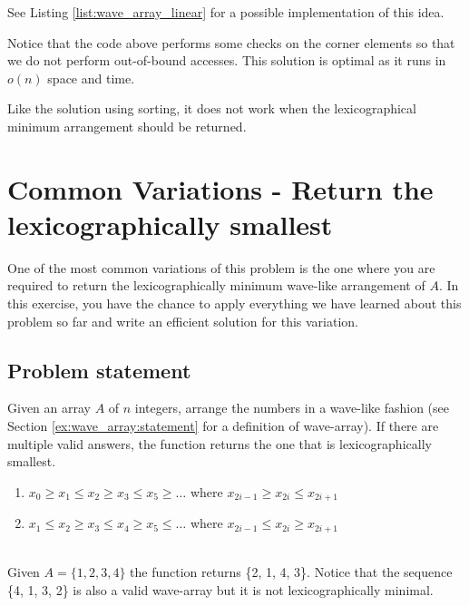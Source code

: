 See Listing \ref{list:wave_array_linear} for a possible implementation of this idea.



Notice that the code above performs some checks on the corner elements so that we do not perform out-of-bound accesses.
This solution is optimal as it runs in $o(n)$ space and time. 

Like the solution using sorting, it does not work when the lexicographical minimum arrangement should be returned.

\section{Common Variations - Return the lexicographically smallest}
\label{sec:wave-array:smallest}

One of the most common variations of this problem is the one where you are required to return the lexicographically minimum wave-like arrangement of $A$. In this exercise, you have the chance to apply everything we have learned about this problem so far and write an efficient solution for this variation.

\subsection{Problem statement}
\begin{exercise}
Given an array $A$ of $n$ integers, arrange the numbers in a wave-like fashion (see Section \ref{ex:wave_array:statement} for a definition of wave-array).
If there are multiple valid answers, the function returns the one that is lexicographically smallest.
	\begin{enumerate}
		\item  $x_0 \geq x_1 \leq x_2 \geq x_3 \leq  x_5 \geq \ldots$ where $x_{2i-1} \geq x_{2i} \leq x_{2i+1}$
		\item  $x_1 \leq x_2 \geq x_3 \leq x_4 \geq x_5 \leq \ldots$ where $x_{2i-1} \leq x_{2i} \geq x_{2i+1}$
	\end{enumerate}


	\begin{example}
		\hfill \\
		\label{ex:wave_array:var1:example1}
		Given $A=\{1, 2, 3, 4\}$ the function returns \{2, 1, 4, 3\}. Notice that the sequence \{4, 1, 3, 2\} is also a valid wave-array but it is not lexicographically minimal.
	\end{example}
\end{exercise}
